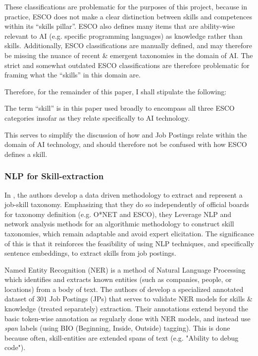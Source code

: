 These classifications are problematic for the purposes of this project, because in practice,
ESCO does not make a clear distinction between skills and competences within its ``skills pillar''.
ESCO also defines many items that are ability-wise relevant to AI (e.g. specific programming languages) as knowledge rather than skills.
Additionally, ESCO classifications are manually defined, and may therefore be missing the nuance of recent \& emergent taxonomies in the domain of AI.
The strict and somewhat outdated ESCO classifications are therefore problematic for framing what the ``skills'' in this domain are.

Therefore, for the remainder of this paper, I shall stipulate the following:
\begin{tcolorbox}[colback=gray!5!white,colframe=black!50,title=Stipulation]
  The term ``skill'' is in this paper used broadly to encompass all three ESCO categories insofar as they relate specifically to AI technology.
\end{tcolorbox}
This serves to simplify the discussion of how \gh{} and Job Postings relate within the domain of AI technology, and should therefore not be confused with how ESCO defines a skill.

\subsubsection{NLP for Skill-extraction}
In \cite{escoe-2018-taxonomy}, the authors develop a data driven methodology to extract and represent a job-skill taxonomy.
Emphasizing that they do so independently of official boards for taxonomy definition (e.g. O*NET and ESCO), they Leverage NLP and network analysis methods for an algorithmic methodology to construct skill taxonomies, which remain adaptable and avoid expert elicitation.
The significance of this is that it reinforces the feasibility of using NLP techniques, and specifically sentence embeddings, to extract skills from job postings.

Named Entity Recognition (NER) is a method of Natural Language Processing which identifies and extracts known entities (such as companies, people, or locations) from a body of text.
The authors of \cite{zhang-etal-2022-skillspan} develop a specialized annotated dataset of $301$ Job Postings (JPs) that serves to validate NER models for skills \& knowledge (treated separately) extraction.
Their annotations extend beyond the basic token-wise annotation as regularly done with NER models, and instead use \emph{span} labels (using BIO (Beginning, Inside, Outside) tagging). This is done because often, skill-entities are extended spans of text (e.g. "Ability to debug code").

